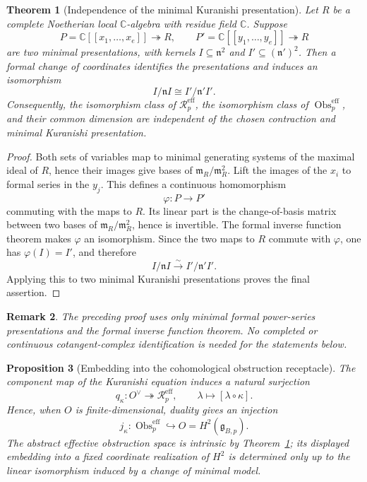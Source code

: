 \documentclass[11pt]{amsart}
\newtheorem{theorem}{Theorem}[section]
\newtheorem{proposition}[theorem]{Proposition}
\newtheorem{remark}[theorem]{Remark}
\newcommand{\Obs}{\operatorname{Obs}}
\newcommand{\C}{\mathbb C}
\newcommand{\ghoch}{\mathfrak g}
\begin{document}
\begin{theorem}[Independence of the minimal Kuranishi presentation]\label{thm:effective-intrinsic}
Let $R$ be a complete Noetherian local $\C$-algebra with residue field $\C$.  Suppose
\[
P=\C[[x_1,\ldots,x_e]]\twoheadrightarrow R,
\qquad
P'=\C[[y_1,\ldots,y_e]]\twoheadrightarrow R
\]
are two minimal presentations, with kernels $I\subseteq\mathfrak n^2$ and $I'\subseteq(\mathfrak n')^2$.  Then a formal change of coordinates identifies the presentations and induces an isomorphism
\[
I/\mathfrak n I
\cong
I'/\mathfrak n'I'.
\]
Consequently, the isomorphism class of $\mathscr R^{\mathrm{eff}}_p$, the isomorphism class of $\Obs^{\mathrm{eff}}_p$, and their common dimension are independent of the chosen contraction and minimal Kuranishi presentation.
\end{theorem}

\begin{proof}
Both sets of variables map to minimal generating systems of the maximal ideal of $R$, hence their images give bases of $\mathfrak m_R/\mathfrak m_R^2$.  Lift the images of the $x_i$ to formal series in the $y_j$.  This defines a continuous homomorphism
\[
\varphi:P\longrightarrow P'
\]
commuting with the maps to $R$.  Its linear part is the change-of-basis matrix between two bases of $\mathfrak m_R/\mathfrak m_R^2$, hence is invertible.  The formal inverse function theorem makes $\varphi$ an isomorphism.  Since the two maps to $R$ commute with $\varphi$, one has $\varphi(I)=I'$, and therefore
\[
I/\mathfrak n I\xrightarrow{\sim}I'/\mathfrak n'I'.
\]
Applying this to two minimal Kuranishi presentations proves the final assertion.
\end{proof}

\begin{remark}
The preceding proof uses only minimal formal power-series presentations
and the formal inverse function theorem. No completed or continuous
cotangent-complex identification is needed for the statements below.
\end{remark}

\begin{proposition}[Embedding into the cohomological obstruction receptacle]\label{prop:effective-into-h2}
The component map of the Kuranishi equation induces a natural surjection
\[
q_\kappa:O^\vee\twoheadrightarrow\mathscr R^{\mathrm{eff}}_p,
\qquad
\lambda\longmapsto[\lambda\circ\kappa].
\]
Hence, when $O$ is finite-dimensional, duality gives an injection
\[
j_\kappa:\Obs^{\mathrm{eff}}_p\hookrightarrow O=H^2(\ghoch_{B,p}).
\]
The abstract effective obstruction space is intrinsic by Theorem~\ref{thm:effective-intrinsic}; its displayed embedding into a fixed coordinate realization of $H^2$ is determined only up to the linear isomorphism induced by a change of minimal model.
\end{proposition}
\end{document}
